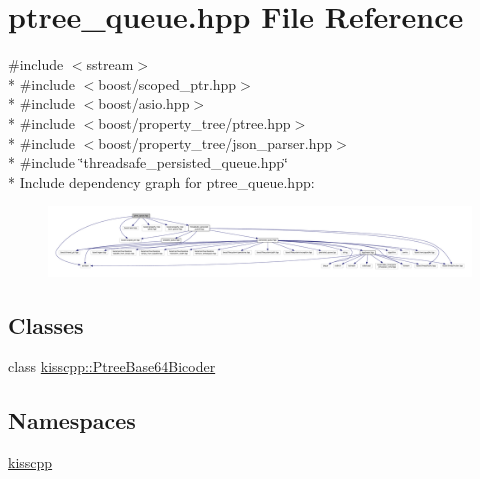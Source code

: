 \hypertarget{a00071}{\section{ptree\-\_\-queue.\-hpp File Reference}
\label{a00071}
}
{\ttfamily \#include $<$sstream$>$}\\*
{\ttfamily \#include $<$boost/scoped\-\_\-ptr.\-hpp$>$}\\*
{\ttfamily \#include $<$boost/asio.\-hpp$>$}\\*
{\ttfamily \#include $<$boost/property\-\_\-tree/ptree.\-hpp$>$}\\*
{\ttfamily \#include $<$boost/property\-\_\-tree/json\-\_\-parser.\-hpp$>$}\\*
{\ttfamily \#include \char`\"{}threadsafe\-\_\-persisted\-\_\-queue.\-hpp\char`\"{}}\\*
Include dependency graph for ptree\-\_\-queue.\-hpp\-:\nopagebreak
\begin{figure}[H]
\begin{center}
\leavevmode
\includegraphics[width=350pt]{a00115}
\end{center}
\end{figure}
\subsection*{Classes}
\begin{DoxyCompactItemize}
\item 
class \hyperlink{a00036}{kisscpp\-::\-Ptree\-Base64\-Bicoder}
\end{DoxyCompactItemize}
\subsection*{Namespaces}
\begin{DoxyCompactItemize}
\item 
\hyperlink{a00089}{kisscpp}
\end{DoxyCompactItemize}
